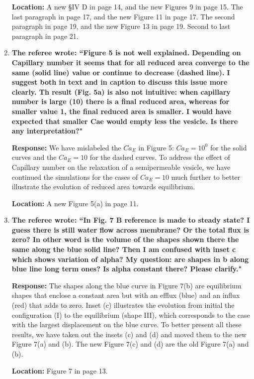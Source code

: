 \documentclass[12pt]{article}
\begin{document}
\begin{enumerate}
\noindent
{\bf Location:} A new \S IV D in page 14, and the new Figures 9 in page 15. The last paragraph in page 17, and the new Figure 11 in page 17. The second paragraph in page 19, and the new Figure 13 in page 19. Second to last paragraph in page 21.


\item {\bf 
The referee wrote:
``Figure 5 is not well explained. Depending on Capillary number it
seems that for all reduced area converge to the same (solid line)
value or continue to decrease (dashed line). I suggest both in text
and in caption to discuss this issue more clearly. Th result (Fig. 5a)
is also not intuitive: when capillary number is large (10) there is a
final reduced area, whereas for smaller value 1, the final reduced
area is smaller. I would have expected that smaller Cae would empty
less the vesicle. Is there any interpretation?"}

\noindent
{\bf Response:} We have mislabeled the $Ca_E$ in Figure 5:  $Ca_E=10^0$
for the solid curves and the $Ca_E=10$ for the dashed curves. To address
the effect of Capillary number on the relaxation of a semipermeable
vesicle, we have continued the simulations for the cases of $Ca_E = 10$
much further to better illustrate the evolution of reduced area towards
equilibrium.

\noindent
{\bf Location:} A new Figure 5(a) in page 11.

\item{\bf
The referee wrote:
``In Fig. 7 B reference is made to steady state? I guess there is
still water flow across membrane? Or the total flux is zero? In other
word is the volume of the shapes shown there the same along the blue
solid line? Then I am confused with inset c which shows variation of
alpha? My question: are shapes in b along blue line long term ones? Is
alpha constant there? Please clarify."}

\noindent
{\bf Response:} The shapes along the blue curve in Figure 7(b) are
equilibrium shapes that enclose a constant area but with an efflux
(blue) and an influx (red) that adds to zero. Inset (c) illustrates the
evolution from initial  the configuration (I) to the equilibrium (shape
III), which corresponds to the case with the largest displacement on the
blue curve. To better present all these results, we have taken out the
insets (c) and (d) and moved them to the new Figure 7(a) and (b). The
new Figure 7(c) and (d) are the old Figure 7(a) and (b).

\noindent
{\bf Location:} Figure 7 in page 13.


\end{enumerate}
\end{document}
